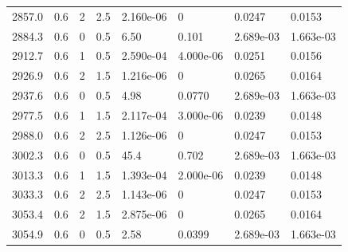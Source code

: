 \documentclass[preview]{standalone}
\begin{document}
{{{\begin{tabular}{L{1.2cm}C{1.2cm} C{0.3cm}C{0.5cm} C{1.4cm}C{1.4cm} C{1.4cm}C{1.4cm}}
  2857.0  &   0.6  & 2     & 2.5 &  2.160e-06  & 0  & 0.0247 &  0.0153   \\ 
  2884.3  &   0.6  & 0     & 0.5 &  6.50  & 0.101  & 2.689e-03 &  1.663e-03   \\ 
  2912.7  &   0.6  & 1     & 0.5 &  2.590e-04  & 4.000e-06  & 0.0251 &  0.0156   \\ 
  2926.9  &   0.6  & 2     & 1.5 &  1.216e-06  & 0  & 0.0265 &  0.0164   \\ 
  2937.6  &   0.6  & 0     & 0.5 &  4.98  & 0.0770  & 2.689e-03 &  1.663e-03   \\ 
  2977.5  &   0.6  & 1     & 1.5 &  2.117e-04  & 3.000e-06  & 0.0239 &  0.0148   \\ 
  2988.0  &   0.6  & 2     & 2.5 &  1.126e-06  & 0  & 0.0247 &  0.0153   \\ 
  3002.3  &   0.6  & 0     & 0.5 &  45.4  & 0.702  & 2.689e-03 &  1.663e-03   \\ 
  3013.3  &   0.6  & 1     & 1.5 &  1.393e-04  & 2.000e-06  & 0.0239 &  0.0148   \\ 
  3033.3  &   0.6  & 2     & 2.5 &  1.143e-06  & 0  & 0.0247 &  0.0153   \\ 
  3053.4  &   0.6  & 2     & 1.5 &  2.875e-06  & 0  & 0.0265 &  0.0164   \\ 
  3054.9  &   0.6  & 0     & 0.5 &  2.58  & 0.0399  & 2.689e-03 &  1.663e-03   \\ 
\hline 
\end{tabular} 

}}}
\end{document}
